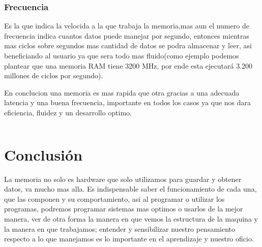 \documentclass{article}
\begin{document}
    \subsubsection{Frecuencia} Es la que indica la velocida a la que trabaja la memoria,mas aun el numero de frecuencia indica cuantos datos puede manejar por segundo, entonces mientras mas ciclos sobre segundos mas cantidad de datos se podra almacenar y leer, asi beneficiando al usuario ya que sera todo mas fluido(como ejemplo podemos plantear que una memoria RAM tiene 3200 MHz, por ende esta ejecutará 3.200 millones de ciclos por segundo).
    
    En conclucion una memoria es mas rapida que otra gracias a una adecuada latencia y una buena frecuencia, importante en todos los casos ya que nos dara eficiencia, fluidez y un desarrollo optimo.

\begin{lstlisting}

\end{lstlisting}

\section{Conclusión} \label{conclulsion}
La memoria no solo es hardware que solo utilizamos para guardar y obtener datos, va mucho mas alla. Es indispensable saber el funcionamiento de cada una, que las componen y su comportamiento, asi al programar o utilizar los programas, podremos programar sistemas mas optimos o usarlos de la mejor manera, ver de otra forma la manera en que vemos la estructura de la maquina y la manera en que trabajamos; entender y sensibilizar nuestro pensamiento respecto a lo que manejamos es lo importante en el aprendizaje y nuestro oficio.



\end{document}

